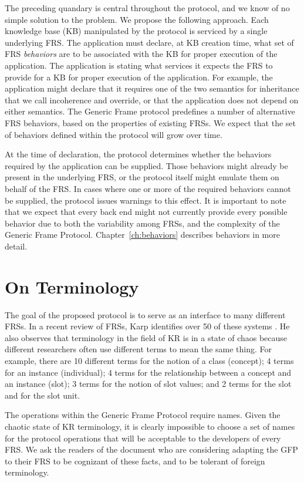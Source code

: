 The preceding quandary is central throughout the protocol, and we know
of no simple solution to the problem.  We propose the following
approach.  Each knowledge base (KB) manipulated by the protocol is
serviced by a single underlying FRS.  The application must declare, at
KB creation time, what set of FRS {\it behaviors} are to be associated
with the KB for proper execution of the application.  The application
is stating what services it expects the FRS to provide for a KB for
proper execution of the application.  For example, the application
might declare that it requires one of the two semantics for
inheritance that we call incoherence and override, or that the
application does not depend on either semantics.  The Generic Frame
protocol predefines a number of alternative FRS behaviors, based on
the properties of existing FRSs.  We expect that the set of behaviors
defined within the protocol will grow over time.

At the time of declaration, the protocol determines whether the
behaviors required by the application can be supplied.  Those
behaviors might already be present in the underlying FRS, or the
protocol itself might emulate them on behalf of the FRS.  In cases
where one or more of the required behaviors cannot be supplied, the
protocol issues warnings to this effect. It is important to note that
we expect that every back end might not currently provide every
possible behavior due to both the variability among FRSs, and the
complexity of the Generic Frame Protocol.  Chapter~\ref{ch:behaviors}
describes behaviors in more detail.

\section{On Terminology}

The goal of the proposed protocol is to serve as an interface to many
different FRSs.  In a recent review of FRSs, Karp identifies over 50
of these systems \cite{KarpFreview}.  He also observes that
terminology in the field of KR is in a state of chaos because
different researchers often use different terms to mean the same
thing.  For example, there are 10 different terms for the notion of a
class (concept); 4 terms for an instance (individual); 4 terms for the
relationship between a concept and an instance (slot); 3 terms for the
notion of slot values; and 2 terms for the slot and for the slot unit.

The operations within the Generic Frame Protocol require names.  Given the
chaotic state of KR terminology, it is clearly impossible to choose a
set of names for the protocol operations that will be acceptable to
the developers of every FRS.  We ask the readers of the document who
are considering adapting the GFP to their FRS to be cognizant
of these facts, and to be tolerant of foreign terminology.  

